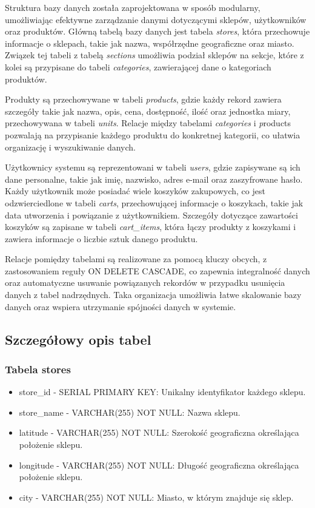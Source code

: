 Struktura bazy danych została zaprojektowana w sposób modularny, umożliwiając efektywne zarządzanie danymi dotyczącymi sklepów, użytkowników oraz produktów. Główną tabelą bazy danych jest tabela \textit{stores}, która przechowuje informacje o sklepach, takie jak nazwa, współrzędne geograficzne oraz miasto. Związek tej tabeli z tabelą \textit{sections} umożliwia podział sklepów na sekcje, które z kolei są przypisane do tabeli \textit{categories}, zawierającej dane o kategoriach produktów.

Produkty są przechowywane w tabeli \textit{products}, gdzie każdy rekord zawiera szczegóły takie jak nazwa, opis, cena, dostępność, ilość oraz jednostka miary, przechowywana w tabeli \textit{units}. Relacje między tabelami \textit{categories} i \textit{p}roducts pozwalają na przypisanie każdego produktu do konkretnej kategorii, co ułatwia organizację i wyszukiwanie danych.

Użytkownicy systemu są reprezentowani w tabeli \textit{users}, gdzie zapisywane są ich dane personalne, takie jak imię, nazwisko, adres e-mail oraz zaszyfrowane hasło. Każdy użytkownik może posiadać wiele koszyków zakupowych, co jest odzwierciedlone w tabeli \textit{carts}, przechowującej informacje o koszykach, takie jak data utworzenia i powiązanie z użytkownikiem. 
Szczegóły dotyczące zawartości koszyków są zapisane w tabeli \textit{cart\_items}, która łączy produkty z koszykami i zawiera informacje o liczbie sztuk danego produktu.

Relacje pomiędzy tabelami są realizowane za pomocą kluczy obcych, z zastosowaniem reguły ON DELETE CASCADE, co zapewnia integralność danych oraz automatyczne usuwanie powiązanych rekordów w przypadku usunięcia danych z tabel nadrzędnych. Taka organizacja umożliwia łatwe skalowanie bazy danych oraz wspiera utrzymanie spójności danych w systemie.

\subsection{Szczegółowy opis tabel}

\subsubsection{Tabela stores}
\begin{itemize}
\item store\_id - SERIAL PRIMARY KEY: Unikalny identyfikator każdego sklepu.
\item store\_name - VARCHAR(255) NOT NULL: Nazwa sklepu.
\item latitude - VARCHAR(255) NOT NULL: Szerokość geograficzna określająca położenie sklepu.
\item longitude - VARCHAR(255) NOT NULL: Długość geograficzna określająca położenie sklepu.
\item city - VARCHAR(255) NOT NULL: Miasto, w którym znajduje się sklep.
\end{itemize}

